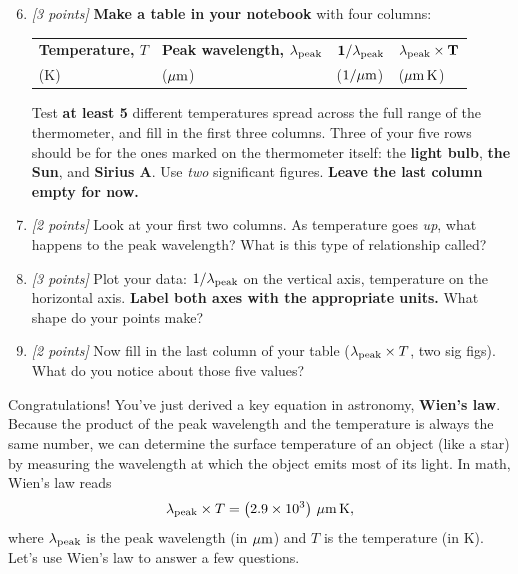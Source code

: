 \documentclass[11pt]{article}
\begin{document}
\begin{enumerate}
    \setcounter{enumi}{5}

    \item \textit{[3 points]}  \textbf{Make a table in your notebook} with four columns:

    \smallskip
    \begin{center}
    \begin{tabular}{@{}llll@{}}
    \textbf{Temperature, $T$} & \textbf{Peak wavelength, $\lambda_{\rm peak}$} &
    $\mathbf{1/\lambda_{\rm peak}}$ & $\mathbf{\lambda_{\rm peak} \times T}$ \\
    (K) & ($\rm \mu m$) & ($\rm 1/\mu m$) & ($\rm \mu m\,K$)
    \end{tabular}
    \end{center}

    \smallskip
    Test \textbf{at least 5} different temperatures spread across the full range
    of the thermometer, and fill in the first three columns. Three of your five rows
    should be for the ones marked on the thermometer itself: the \textbf{light
    bulb}, \textbf{the Sun}, and \textbf{Sirius A}. Use
    \emph{two} significant figures. \textbf{Leave the last column empty for
    now.}

    \item \textit{[2 points]}  Look at your first two columns. As temperature goes \emph{up}, what
    happens to the peak wavelength? What is this type of relationship called?

    \item \textit{[3 points]}  Plot your data: $1/\lambda_{\rm peak}$ on
    the vertical axis, temperature on the horizontal axis. \textbf{Label both
    axes with the appropriate units.} What shape do your points make?

    \item \textit{[2 points]}  Now fill in the last column of your table ($\lambda_{\rm peak} \times
    T$, two sig figs). What do you notice about those five values?
\end{enumerate}

\medskip \noindent
Congratulations! You've just derived a key equation in astronomy, \textbf{Wien's law}. Because the product of the peak wavelength and the temperature is always the same number, we can determine the surface temperature of an object (like a star) by measuring the wavelength at which the object emits most of its light. In math, Wien's law reads
\begin{equation}
    \lambda_{\rm peak} \times T = \left(2.9 \times 10^3 \right) \, {\rm \mu m \, K},
\end{equation}
where $\lambda_{\rm peak}$ is the peak wavelength (in $\rm \mu m$) and $T$ is the temperature (in K). Let's use Wien's law to answer a few questions.
\end{document}
